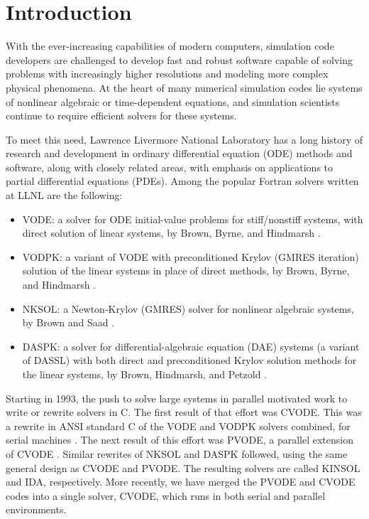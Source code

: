 \section{Introduction}

With the ever-increasing capabilities of modern computers, simulation 
code developers are challenged to develop fast and robust software 
capable of solving problems with increasingly higher resolutions and 
modeling more complex 
physical phenomena.  At the heart of many numerical simulation codes
lie systems of nonlinear algebraic or time-dependent equations, and 
simulation scientists continue to require efficient solvers for these 
systems.  

To meet this need, Lawrence Livermore National Laboratory 
has a long history of research and development in ordinary
differential equation (ODE) methods and software, along with closely related
areas, with emphasis on applications to partial differential equations
(PDEs).  Among the popular Fortran solvers written at LLNL are the
following:
\begin{itemize}
\item VODE: a solver for ODE initial-value problems for stiff/nonstiff
systems, with direct solution of linear systems, by Brown, Byrne, and
Hindmarsh \cite{BBH:89}.
\item VODPK: a variant of VODE with preconditioned Krylov (GMRES
iteration) solution of the linear systems in place of direct methods,
by Brown, Byrne, and Hindmarsh \cite{Byr:92}.
\item NKSOL: a Newton-Krylov (GMRES) solver for nonlinear algebraic
systems, by Brown and Saad \cite{BrSa:90}.
\item DASPK: a solver for differential-algebraic equation (DAE)
systems (a variant of DASSL) with both direct and preconditioned
Krylov solution methods for the linear systems, by Brown, Hindmarsh,
and Petzold \cite{BHP:94}.
\end{itemize}
Starting in 1993, the push to solve large systems in parallel
motivated work to write or rewrite solvers in C.  The first result of
that effort was CVODE.  This was a rewrite in ANSI standard C of the
VODE and VODPK solvers combined, for serial machines
\cite{CoHi:94,CoHi:96}.  The next result of this effort was PVODE, a
parallel extension of CVODE \cite{ByHi:98,ByHi:99}.
Similar rewrites of NKSOL and DASPK followed, using the same
general design as CVODE and PVODE.  The resulting solvers are called
KINSOL and IDA, respectively.
More recently, we have merged the PVODE and CVODE codes into a 
single solver, CVODE, which runs in both serial and parallel environments. 


